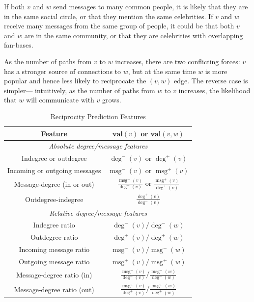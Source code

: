 \documentclass[conference]{IEEEtran}
\begin{document}
If both $v$ and $w$ send messages to many common people, it is likely that they are in the same social circle, or that they mention the same celebrities. 
If $v$ and $w$ receive many messages from the same group of people, it could be that both $v$ and $w$ are in the same community, or that they are celebrities with overlapping fan-bases.

As the number of paths from $v$ to $w$ increases, there are two conflicting forces: $v$ has a stronger source of connections to $w$, but at the same time
$w$ is more popular and hence less likely to reciprocate the $(v,w)$ edge.
The reverse case is simpler--- intuitively, as the number of paths from $w$ to $v$ increases, the likelihood that $w$ will communicate with $v$ grows.

\begin{table}[!t]
\renewcommand{\arraystretch}{1.3}
\caption{Reciprocity Prediction Features}
\label{table_recmethods}
\centering
\begin{tabular}{|c||c|}
\hline
\bf{Feature} & $\mathbf{val}(v)$ or $\mathbf{val}(v,w)$\\
\hline
\multicolumn{2}{|c|}{\emph{Absolute degree/message features}} \\
\hline
Indegree or outdegree & $\deg^-(v)$ or $\deg^+(v)$ \\
Incoming or outgoing messages & $\operatorname{msg}^-(v)$ or $\operatorname{msg}^+(v)$ \\
Message-degree (in or out) & $\frac{\operatorname{msg}^-(v)}{\deg^-(v)}$ or $\frac{\operatorname{msg}^+(v)}{\deg^+(v)}$ \\
Outdegree-indegree & $\frac{\deg^+(v)}{\deg^-(v)}$ \\
\hline
\multicolumn{2}{|c|}{\emph{Relative degree/message features}} \\
\hline
Indegree ratio & $\deg^-(v) / \deg^-(w)$ \\
Outdegree ratio & $\deg^+(v) / \deg^+(w)$ \\
\hline
Incoming message ratio & $\operatorname{msg}^-(v) / \operatorname{msg}^-(w)$ \\
Outgoing message ratio & $\operatorname{msg}^+(v) / \operatorname{msg}^+(w)$ \\
\hline
Message-degree ratio (in) & $\frac{\operatorname{msg}^-(v)}{\deg^-(v)} / \frac{\operatorname{msg}^-(w)}{\deg^-(w)}$ \\
Message-degree ratio (out) & $\frac{\operatorname{msg}^+(v)}{\deg^+(v)} / \frac{\operatorname{msg}^+(w)}{\deg^+(w)}$ \\

\end{tabular}
\end{table}
\end{document}
